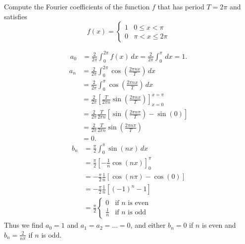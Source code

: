 \documentclass[11pt]{article}
\begin{document}

\begin{exercise}
    Compute the Fourier coefficients of the function $f$ that has period $T = 2\pi$ and satisfies
    \[
        f(x) = \left\{\begin{array}{ll} 1 & 0 \leq x < \pi \\ 0 & \pi < x \leq 2\pi \end{array}\right.
    \]
\end{exercise}
\begin{solution}     
    \begin{align*}
        a_0 
        &= 
        \frac{2}{2\pi} \int_0^{2\pi} f(x) \, dx 
        = 
        \frac{2}{2\pi} \int_0^\pi \, dx  = 1
        .
    \end{align*}
    \begin{align*}
        a_n 
        &= 
        \frac{2}{2\pi} \int_0^{2\pi} \cos\left(\frac{2\pi n x}{T}\right) \, dx 
        \\&= 
        \frac{2}{2\pi} \int_0^\pi \cos\left(\frac{2\pi n x}{T}\right) \, dx 
        \\
        &= 
        \frac{2}{2\pi} \left[ \frac{T}{2\pi n} \sin\left(\frac{2\pi n x}{T}\right) \right]_{x=0}^{x=\pi}
        \\&= 
        \frac{2}{2\pi} \frac{T}{2\pi n} \left[ \sin\left(\frac{2\pi n \pi}{T}\right) - \sin(0) \right] 
        \\&= 
        \frac{2}{2\pi} \frac{T}{2\pi n} \sin\left(\frac{2\pi n \pi}{T}\right) 
        \\&= 
        0.
    \end{align*}
    \begin{align*}
        b_n 
        &= 
        \frac{\pi}{2}
        \int_0^\pi \sin(nx) \, dx 
        \\
        &= 
        \frac{\pi}{2}
        \left[-\frac{1}{n} \cos(nx)\right]_0^\pi 
        \\
        &= 
        -\frac{\pi}{2}
        \frac{1}{n} \left[ \cos(n\pi) - \cos(0) \right] 
        \\
        &= 
        -
        \frac{\pi}{2}
        \frac{1}{n} \left[ (-1)^n - 1 \right] 
        \\
        &= 
        \frac{\pi}{2}
        \begin{cases}
            0 & \text{if } n \text{ is even} 
            \\
            \frac{1}{n} & \text{if } n \text{ is odd}
        \end{cases}
    \end{align*}
    Thus we find $a_0 = 1$ and $a_1 = a_2 = \dots = 0$,
    and either $b_n = 0$ if $n$ is even and $b_n = \frac{2}{n\pi}$ if $n$ is odd. 
\end{solution}
\end{document}
